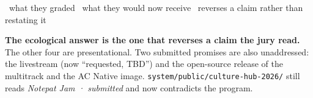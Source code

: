 \documentclass[11pt]{article}
\begin{document}
\vspace{0.35em}
{\fontsize{9pt}{11pt}\selectfont\color{acgray}%
~what they graded\qquad
{}~what they would now receive\qquad
{}~reverses a claim rather than restating it\par}

\vspace{0.5em}
{\fontsize{10.2pt}{13.2pt}\selectfont
\textbf{The ecological answer is the one that reverses a claim the jury read.}
The other four are presentational. Two submitted promises are also unaddressed:
the livestream (now ``requested, TBD'') and the open-source release of the
multitrack and the AC Native image. \texttt{system/public/culture-hub-2026/}
still reads \emph{Notepat Jam · submitted} and now contradicts the program.\par}
\end{document}
